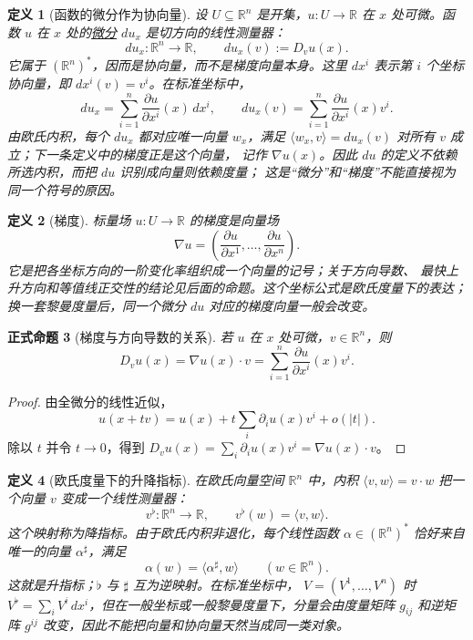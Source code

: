 \documentclass[UTF8,fontset=none,a4paper,11pt]{ctexart}
\theoremstyle{foundation-definition}
\newtheorem{definition}{定义}[section]
\theoremstyle{foundation-theorem}
\theoremstyle{foundation-proposition}
\newtheorem{proposition}[definition]{正式命题}
\theoremstyle{foundation-example}
\theoremstyle{foundation-remark}
\theoremstyle{foundation-theorem}
\newcommand{\term}[2]{\hyperref[#1]{#2}}
\begin{document}
\begin{definition}[函数的微分作为协向量]\label{def:differential-one-form}
设 \(U\subseteq\mathbb R^n\) 是开集，\(u:U\to\mathbb R\) 在 \(x\) 处可微。函数
\(u\) 在 \(x\) 处的\term{def:differential-one-form}{微分} \(du_x\) 是切方向的线性测量器：
\[
du_x:\mathbb R^n\longrightarrow\mathbb R,\qquad
du_x(v):=D_vu(x).
\]
它属于 \((\mathbb R^n)^*\)，因而是协向量，而不是梯度向量本身。这里
\(dx^i\) 表示第 \(i\) 个坐标协向量，即 \(dx^i(v)=v^i\)。在标准坐标中，
\[
du_x=\sum_{i=1}^n\frac{\partial u}{\partial x^i}(x)\,dx^i,
\qquad
du_x(v)=\sum_{i=1}^n\frac{\partial u}{\partial x^i}(x)v^i.
\]
由欧氏内积，每个 \(du_x\) 都对应唯一向量 \(w_x\)，满足
\(\langle w_x,v\rangle=du_x(v)\) 对所有 \(v\) 成立；下一条定义中的梯度正是这个向量，
记作 \(\nabla u(x)\)。因此 \(du\) 的定义不依赖所选内积，而把 \(du\) 识别成向量则依赖度量；
这是“微分”和“梯度”不能直接视为同一个符号的原因。
\end{definition}

\begin{definition}[梯度]\label{def:gradient}
标量场 \(u:U\to\mathbb R\) 的梯度是向量场
\[
\nabla u
=\left(\frac{\partial u}{\partial x^1},\ldots,
\frac{\partial u}{\partial x^n}\right).
\]
它是把各坐标方向的一阶变化率组织成一个向量的记号；关于方向导数、
最快上升方向和等值线正交性的结论见后面的命题。这个坐标公式是欧氏度量下的表达；
换一套黎曼度量后，同一个微分 \(du\) 对应的梯度向量一般会改变。
\end{definition}

\begin{proposition}[梯度与方向导数的关系]\label{prop:gradient-direction-derivative}
若 \(u\) 在 \(x\) 处可微，\(v\in\mathbb R^n\)，则
\[
D_vu(x)=\nabla u(x)\cdot v
=\sum_{i=1}^n\frac{\partial u}{\partial x^i}(x)v^i.
\]
\end{proposition}

\begin{proof}
由全微分的线性近似，
\[
u(x+tv)=u(x)+t\sum_i\partial_i u(x)v^i+o(|t|).
\]
除以 \(t\) 并令 \(t\to0\)，得到
\(D_vu(x)=\sum_i\partial_i u(x)v^i=\nabla u(x)\cdot v\)。
\end{proof}

\begin{definition}[欧氏度量下的升降指标]\label{def:musical-isomorphism}
在欧氏向量空间 \(\mathbb R^n\) 中，内积 \(\langle v,w\rangle=v\cdot w\) 把一个向量
\(v\) 变成一个线性测量器：
\[
v^\flat:\mathbb R^n\to\mathbb R,\qquad
v^\flat(w)=\langle v,w\rangle.
\]
这个映射称为降指标。由于欧氏内积非退化，每个线性函数
\(\alpha\in(\mathbb R^n)^*\) 恰好来自唯一的向量 \(\alpha^\sharp\)，满足
\[
\alpha(w)=\langle\alpha^\sharp,w\rangle\qquad(w\in\mathbb R^n).
\]
这就是升指标；\(\flat\) 与 \(\sharp\) 互为逆映射。在标准坐标中，
\(V=(V^1,\ldots,V^n)\) 时 \(V^\flat=\sum_iV^i\,dx^i\)，但在一般坐标或一般黎曼度量下，分量会由度量矩阵 \(g_{ij}\) 和逆矩阵 \(g^{ij}\) 改变，因此不能把向量和协向量天然当成同一类对象。
\end{definition}
\end{document}
